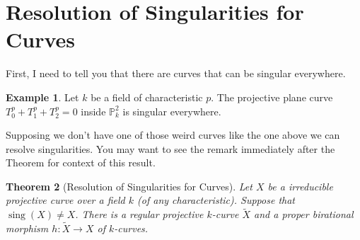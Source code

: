 \documentclass[12pt]{article}
\numberwithin{equation}{section}
\newtheorem{theorem}{Theorem}[subsection]
\theoremstyle{definition}
\newtheorem{example}[theorem]{Example}
\theoremstyle{remark}
\newcommand{\PP}{\mathbb{P}}
\newcommand{\sing}{\operatorname{sing}}
\begin{document}
\section{Resolution of Singularities for Curves}
First, I need to tell you that there are curves that can be singular everywhere. 
\begin{example}
	Let $k$ be a field of characteristic $p$.
	The projective plane curve $T_0^p+T_1^p+T_2^p=0$ inside $\PP^2_k$ is singular everywhere. 
\end{example}

Supposing we don't have one of those weird curves like the one above we can resolve singularities. 
You may want to see the remark immediately after the Theorem for context of this result.

\begin{theorem}[Resolution of Singularities for Curves]
	Let $X$ be a irreducible projective curve over a field $k$ (of any characteristic). 
	Suppose that $\sing(X)\neq X$. 
	There is a regular projective $k$-curve $\widetilde{X}$ and a proper birational morphism $h:\widetilde{X} \to X$ of $k$-curves.  
\end{theorem}
\end{document}

